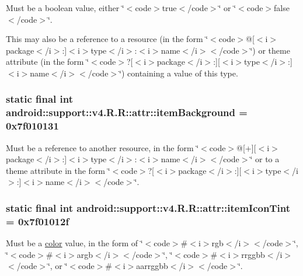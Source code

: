 Must be a boolean value, either \char`\"{}$<$code$>$true$<$/code$>$\char`\"{} or \char`\"{}$<$code$>$false$<$/code$>$\char`\"{}. 

This may also be a reference to a resource (in the form \char`\"{}$<$code$>$@\mbox{[}$<$i$>$package$<$/i$>$:\mbox{]}$<$i$>$type$<$/i$>$:$<$i$>$name$<$/i$>$$<$/code$>$\char`\"{}) or theme attribute (in the form \char`\"{}$<$code$>$?\mbox{[}$<$i$>$package$<$/i$>$:\mbox{]}\mbox{[}$<$i$>$type$<$/i$>$:\mbox{]}$<$i$>$name$<$/i$>$$<$/code$>$\char`\"{}) containing a value of this type. \hypertarget{classandroid_1_1support_1_1v4_1_1_r_1_1attr_31e7fc58e7919766ef0e661a094e6b36}{
\subsubsection[{itemBackground}]{\setlength{\rightskip}{0pt plus 5cm}static final int android::support::v4.R.R::attr::itemBackground = 0x7f010131}}
\label{classandroid_1_1support_1_1v4_1_1_r_1_1attr_31e7fc58e7919766ef0e661a094e6b36}


Must be a reference to another resource, in the form \char`\"{}$<$code$>$@\mbox{[}+\mbox{]}\mbox{[}$<$i$>$package$<$/i$>$:\mbox{]}$<$i$>$type$<$/i$>$:$<$i$>$name$<$/i$>$$<$/code$>$\char`\"{} or to a theme attribute in the form \char`\"{}$<$code$>$?\mbox{[}$<$i$>$package$<$/i$>$:\mbox{]}\mbox{[}$<$i$>$type$<$/i$>$:\mbox{]}$<$i$>$name$<$/i$>$$<$/code$>$\char`\"{}. \hypertarget{classandroid_1_1support_1_1v4_1_1_r_1_1attr_64e709cb6a5115de07252353b28e48dc}{
\subsubsection[{itemIconTint}]{\setlength{\rightskip}{0pt plus 5cm}static final int android::support::v4.R.R::attr::itemIconTint = 0x7f01012f}}
\label{classandroid_1_1support_1_1v4_1_1_r_1_1attr_64e709cb6a5115de07252353b28e48dc}


Must be a \hyperlink{classandroid_1_1support_1_1v4_1_1_r_1_1color}{color} value, in the form of \char`\"{}$<$code$>$\#$<$i$>$rgb$<$/i$>$$<$/code$>$\char`\"{}, \char`\"{}$<$code$>$\#$<$i$>$argb$<$/i$>$$<$/code$>$\char`\"{}, \char`\"{}$<$code$>$\#$<$i$>$rrggbb$<$/i$>$$<$/code$>$\char`\"{}, or \char`\"{}$<$code$>$\#$<$i$>$aarrggbb$<$/i$>$$<$/code$>$\char`\"{}. 

